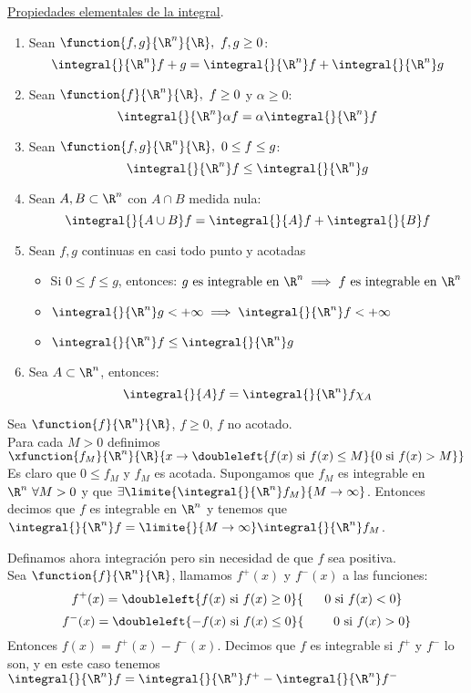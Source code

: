 \begin{corolario} \underline{Propiedades elementales de la integral}.
\begin{enumerate}[1)]
\item Sean $\function{f,g}{\R^n}{\R},\ f,g\geq 0$:
\[\integral{}{\R^n}f+g=\integral{}{\R^n}f+\integral{}{\R^n}g\]
\item Sean $\function{f}{\R^n}{\R},\ f\geq 0$ y $\alpha\geq 0$: 
\[\integral{}{\R^n}\alpha f=\alpha\integral{}{\R^n}f\]
\item Sean $\function{f,g}{\R^n}{\R},\ 0\leq f\leq g$:
\[\integral{}{\R^n}f\leq\integral{}{\R^n}g\]
\item Sean $A,B\subset\R^n$ con $A\cap B$ medida nula:
\[\integral{}{A\cup B}f=\integral{}{A}f+\integral{}{B}f\]
\item Sean $f,g$ continuas en casi todo punto y acotadas
\begin{itemize}
\item Si $0\leq f\leq g$, entonces: 
$g \mathrm{\ es\ integrable\ en\ }\R^n\implies f \mathrm{\ es\ integrable\ en\ }\R^n$
\item $\integral{}{\R^n}g <+\infty\implies \integral{}{\R^n}f <+\infty$
\item $\integral{}{\R^n}f \leq \integral{}{\R^n}g$
\end{itemize} 
\item Sea $A\subset\R^n$, entonces:
\[\integral{}{A}f=\integral{}{\R^n}f\chi_A\]
\end{enumerate}
\end{corolario}

\begin{defi} Sea $\function{f}{\R^n}{\R}$, $f\geq 0$, $f$ no acotado.\\
Para cada $M>0$ definimos $\xfunction{f_M}{\R^n}{\R}{x\to\doubleleft{f(x)\mathrm{\ si\ }f(x)\leq M}{0\mathrm{\ si\ }f(x)>M}}$\\
Es claro que $0\leq f_M$ y $f_M$ es acotada. Supongamos que $f_M$ es integrable en $\R^n\ \forall M>0$ y que $\exists\limite{\integral{}{\R^n}f_M}{M\to\infty}$. Entonces decimos que $f$ es integrable en $\R^n$ y tenemos que\\
$\integral{}{\R^n}f=\limite{}{M\to\infty}\integral{}{\R^n}f_M$.
\end{defi}

\begin{defi} Definamos ahora integración pero sin necesidad de que $f$ sea positiva.\\
Sea $\function{f}{\R^n}{\R}$, llamamos $f^+(x)$ y $f^-(x)$ a las funciones:
\[f^+(x)=\doubleleft{f(x)\mathrm{\ si\ }f(x)\geq 0}{\ \ \ \ \ 0\mathrm{\ si\ }f(x)< 0}\]
\[f^-(x)=\doubleleft{-f(x)\mathrm{\ si\ }f(x)\leq 0}{\ \ \ \ \ \ \ 0\mathrm{\ si\ }f(x)> 0}\]
Entonces $f(x)=f^+(x)-f^-(x)$. Decimos que $f$ es integrable si $f^+$ y $f^-$ lo son, y en este caso tenemos $\integral{}{\R^n}f=\integral{}{\R^n}f^+-\integral{}{\R^n}f^-$
\end{defi}

